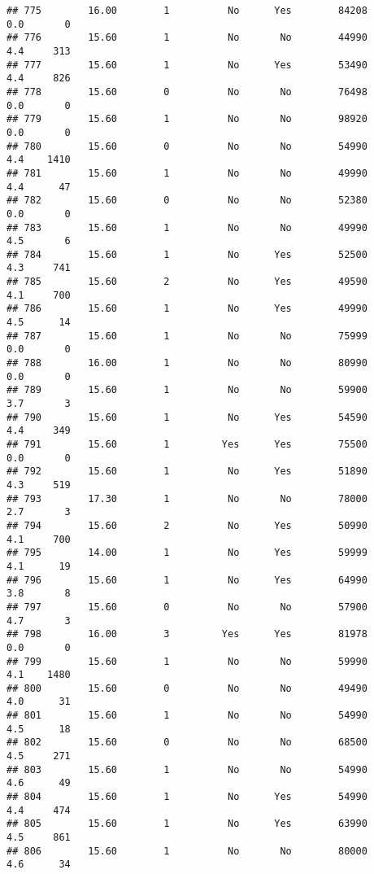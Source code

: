 \documentclass[
]{article}
\begin{document}
\begin{verbatim}
## 775        16.00        1          No      Yes        84208         0.0       0
## 776        15.60        1          No       No        44990         4.4     313
## 777        15.60        1          No      Yes        53490         4.4     826
## 778        15.60        0          No       No        76498         0.0       0
## 779        15.60        1          No       No        98920         0.0       0
## 780        15.60        0          No       No        54990         4.4    1410
## 781        15.60        1          No       No        49990         4.4      47
## 782        15.60        0          No       No        52380         0.0       0
## 783        15.60        1          No       No        49990         4.5       6
## 784        15.60        1          No      Yes        52500         4.3     741
## 785        15.60        2          No      Yes        49590         4.1     700
## 786        15.60        1          No      Yes        49990         4.5      14
## 787        15.60        1          No       No        75999         0.0       0
## 788        16.00        1          No       No        80990         0.0       0
## 789        15.60        1          No       No        59900         3.7       3
## 790        15.60        1          No      Yes        54590         4.4     349
## 791        15.60        1         Yes      Yes        75500         0.0       0
## 792        15.60        1          No      Yes        51890         4.3     519
## 793        17.30        1          No       No        78000         2.7       3
## 794        15.60        2          No      Yes        50990         4.1     700
## 795        14.00        1          No      Yes        59999         4.1      19
## 796        15.60        1          No      Yes        64990         3.8       8
## 797        15.60        0          No       No        57900         4.7       3
## 798        16.00        3         Yes      Yes        81978         0.0       0
## 799        15.60        1          No       No        59990         4.1    1480
## 800        15.60        0          No       No        49490         4.0      31
## 801        15.60        1          No       No        54990         4.5      18
## 802        15.60        0          No       No        68500         4.5     271
## 803        15.60        1          No       No        54990         4.6      49
## 804        15.60        1          No      Yes        54990         4.4     474
## 805        15.60        1          No      Yes        63990         4.5     861
## 806        15.60        1          No       No        80000         4.6      34

\end{verbatim}
\end{document}
